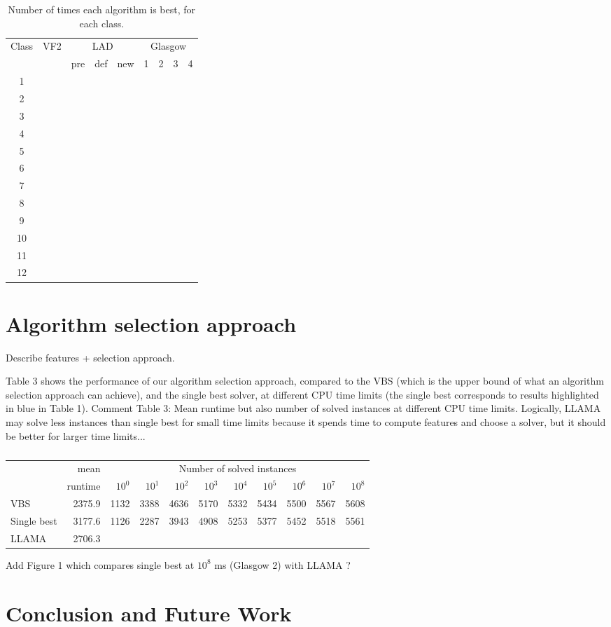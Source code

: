 \documentclass{llncs}
\begin{document}
\begin{table}
\begin{center}
\begin{tabular}{|c||r||r|r|r||r|r|r|r|}
\hline
Class & VF2 & \multicolumn{3}{c||}{LAD} & \multicolumn{4}{c|}{Glasgow}\\
&&pre&def&new&1&2&3&4\\\hline
1\\\hline
2\\\hline
3\\\hline
4\\\hline
5\\\hline
6\\\hline
7\\\hline
8\\\hline
9\\\hline
10\\\hline
11\\\hline
12\\\hline

\end{tabular}
\end{center}
\caption{Number of times each algorithm is best, for each class.\label{expClass}}
\end{table}

\section{Algorithm selection approach}

Describe features + selection approach.

Table 3 shows the performance of our algorithm selection approach, compared to the VBS (which is the upper bound of what an algorithm selection approach can achieve), and the single best solver, at different CPU time limits (the single best corresponds to results highlighted in blue in Table 1). Comment Table 3: Mean runtime but also number of solved instances at different CPU time limits. Logically, LLAMA may solve less instances than single best for small time limits because it spends time to compute features and choose a solver, but it should be better for larger time limits...

\begin{table}
\begin{tabular}{|l|r|rrrrrrrrr|}
&mean & \multicolumn{9}{c|}{Number of solved instances}\\
&runtime & $10^0$ &  $10^1$ &  $10^2$ &  $10^3$ &  $10^4$ &  $10^5$ &  $10^6$ &  $10^7$ &  $10^8$\\\hline
VBS & 2375.9 & 1132 & 3388 & 4636 & 5170 & 5332 & 5434 & 5500 & 5567 & 5608\\\hline
Single best & 3177.6 & 1126 & 2287 & 3943 & 4908 & 5253 & 5377 & 5452 & 5518 & 5561\\\hline
LLAMA & 2706.3\\\hline
\end{tabular}
\caption{}
\end{table}

Add Figure 1 which compares single best at $10^8$ ms (Glasgow 2) with LLAMA ?

\section{Conclusion and Future Work}




\end{document}
